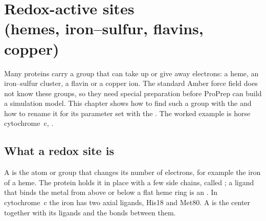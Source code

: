 \chapter[Redox-active sites (hemes, iron--sulfur, flavins, copper)]{Redox-active sites\\(hemes, iron--sulfur, flavins, copper)}
\label{ch:redox}

Many proteins carry a group that can take up or give away electrons: a heme,
an iron--sulfur cluster, a flavin or a copper ion. The standard Amber force
field does not know these groups, so they need special preparation before
ProPrep can build a simulation model. This chapter shows how to find such a
group with the  and how to rename it for its
parameter set with the . The worked example
is horse cytochrome~c, .

\begin{glance}
\end{glance}

\section{What a redox site is}
\label{sec:redox-what}

A  is the atom or group that changes its number of
electrons, for example the iron of a heme. The protein holds it in place with
a few side chains, called ; a ligand that binds the metal from
above or below a flat heme ring is an . In cytochrome~c the
iron has two axial ligands, His18 and Met80. A  is the
center together with its ligands and the bonds between them.

